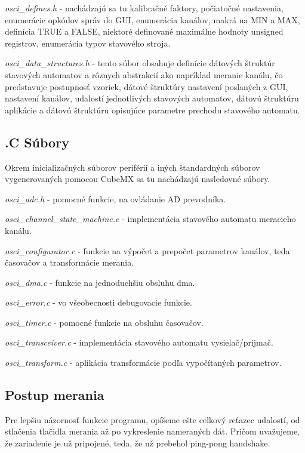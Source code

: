 \documentclass[main.tex]{subfiles}
\begin{document}
\begin{multicols*}{2}
			\textit{osci\_defines.h } - nachádzajú sa tu kalibračné faktory, počiatočné nastavenia, enumerácie opkódov správ do GUI, enumerácia kanálov, makrá na MIN a MAX, definícia TRUE a FALSE, niektoré definované maximálne hodnoty unsigned registrov, enumerácia typov stavového stroja.
			
			\textit{osci\_data\_structures.h} - tento súbor obsahuje definície dátových štruktúr stavových automatov a rôznych abstrakcií ako napríklad meranie kanálu, čo predstavuje postupnosť vzoriek, dátové štruktúry nastavení poslaných z GUI, nastavení kanálov, udalostí jednotlivých stavových automatov, dátovú štruktúru aplikácie a dátovú štruktúru opisujúce parametre prechodu stavového automatu.
			\subsection{.C Súbory}
			Okrem inicializačných súborov periférií a iných štandardných súborov vygenerovaných pomocou CubeMX sa tu nachádzajú nasledovné súbory.
			
			\textit{ osci\_adc.h} - pomocné funkcie, na ovládanie AD prevodníka. 
			
			\textit{ osci\_channel\_state\_machine.c} - implementácia stavového automatu meracieho kanálu. 
			
			\textit{ osci\_configurator.c} -  funkcie na výpočet a prepočet parametrov kanálov, teda časovačov a transformácie merania. 
			
			\textit{ osci\_dma.c} - funkcie na jednoduchšiu obsluhu dma. 
			
			\textit{ osci\_error.c} - vo všeobecnosti debugovacie funkcie.
			
			\textit{ osci\_timer.c} - pomocné funkcie na obsluhu časovačov. 
			
			\textit{ osci\_transceiver.c} - implementácia stavového automatu vysielač/prijmač.
			
			\textit{ osci\_transform.c} - aplikácia transformácie podľa vypočítaných parametrov.
			
			\subsection{Postup merania}
			Pre lepšiu názornosť funkcie programu, opíšeme ešte celkový reťazec udalostí, od stlačenia tlačidla merania až po vykreslenie nameraných dát. Pričom uvažujeme, že zariadenie je už pripojené, teda, že už prebehol ping-pong handshake.
			

\end{multicols*}
\end{document}
